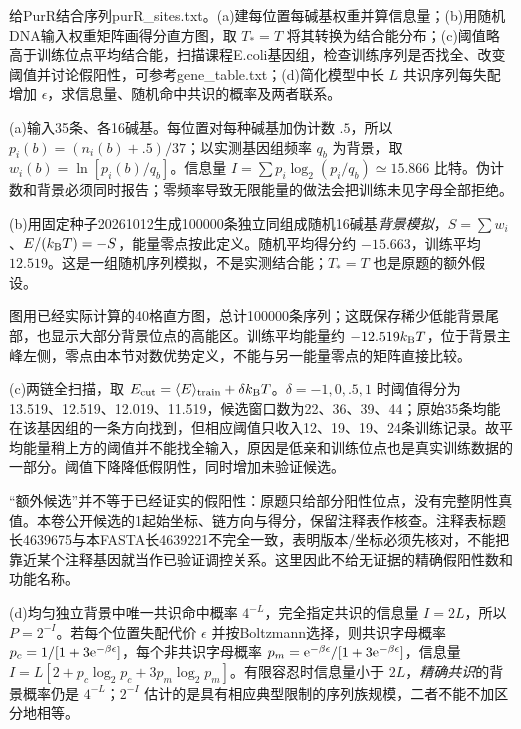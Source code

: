 \begin{exercise}
给PurR结合序列purR\_sites.txt。(a)建每位置每碱基权重并算信息量；(b)用随机DNA输入权重矩阵画得分直方图，取 $T_*=T$ 将其转换为结合能分布；(c)阈值略高于训练位点平均结合能，扫描课程E.coli基因组，检查训练序列是否找全、改变阈值并讨论假阳性，可参考gene\_table.txt；(d)简化模型中长 $L$ 共识序列每失配增加 $\epsilon$，求信息量、随机命中共识的概率及两者联系。
\end{exercise}
\begin{solution}
(a)输入35条、各16碱基。每位置对每种碱基加伪计数 $.5$，所以 $p_i(b)=(n_i(b)+.5)/37$；以实测基因组频率 $q_b$ 为背景，取 $w_i(b)=\ln[p_i(b)/q_b]$。信息量 $I=\sum p_i\log_2(p_i/q_b)\simeq15.866$ 比特。伪计数和背景必须同时报告；零频率导致无限能量的做法会把训练未见字母全部拒绝。

(b)用固定种子20261012生成100000条独立同组成随机16碱基\emph{背景模拟}，$S=\sum w_i$、$E/(k_{\mathrm B} T)=-S$，能量零点按此定义。随机平均得分约 $-15.663$，训练平均 $12.519$。这是一组随机序列模拟，不是实测结合能；$T_*=T$ 也是原题的额外假设。
\begin{center}\end{center}
图用已经实际计算的40格直方图，总计100000条序列；这既保存稀少低能背景尾部，也显示大部分背景位点的高能区。训练平均能量约 $-12.519k_{\mathrm B} T$，位于背景主峰左侧，零点由本节对数优势定义，不能与另一能量零点的矩阵直接比较。


(c)两链全扫描，取 $E_{\rm cut}=\langle E\rangle_{\rm train}+\delta k_{\mathrm B} T$。$\delta=-1,0,.5,1$ 时阈值得分为13.519、12.519、12.019、11.519，候选窗口数为22、36、39、44；原始35条均能在该基因组的一条方向找到，但相应阈值只收入12、19、19、24条训练记录。故平均能量稍上方的阈值并不能找全输入，原因是低亲和训练位点也是真实训练数据的一部分。阈值下降降低假阴性，同时增加未验证候选。

“额外候选”并不等于已经证实的假阳性：原题只给部分阳性位点，没有完整阴性真值。本卷公开候选的1起始坐标、链方向与得分，保留注释表作核查。注释表标题长4639675与本FASTA长4639221不完全一致，表明版本/坐标必须先核对，不能把靠近某个注释基因就当作已验证调控关系。这里因此不给无证据的精确假阳性数和功能名称。

(d)均匀独立背景中唯一共识命中概率 $4^{-L}$，完全指定共识的信息量 $I=2L$，所以 $P=2^{-I}$。若每个位置失配代价 $\epsilon$ 并按Boltzmann选择，则共识字母概率 $p_c=1/[1+3\mathrm e^{-\beta\epsilon}]$，每个非共识字母概率 $p_m=\mathrm e^{-\beta\epsilon}/[1+3\mathrm e^{-\beta\epsilon}]$，信息量 $I=L[2+p_c\log_2p_c+3p_m\log_2p_m]$。有限容忍时信息量小于 $2L$，\emph{精确共识}的背景概率仍是 $4^{-L}$；$2^{-I}$ 估计的是具有相应典型限制的序列族规模，二者不能不加区分地相等。
\end{solution}

